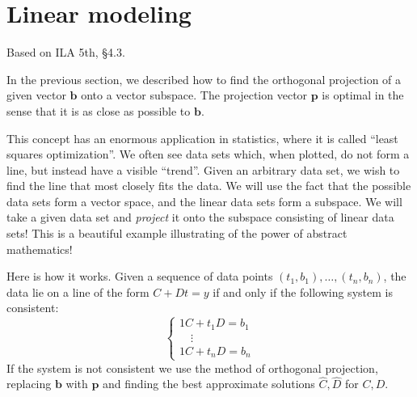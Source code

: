 \documentclass[11pt,oneside]{amsbook}
\theoremstyle{definition}
\theoremstyle{plain}
\theoremstyle{definition}
\theoremstyle{remark}
\numberwithin{equation}{section}
\numberwithin{figure}{section}
\begin{document}
\newpage
\section{Linear modeling}

Based on ILA 5th, \S 4.3.

In the previous section, we described how to find the orthogonal projection of a given vector $\bm{b}$ onto a vector subspace. The projection vector $\bm{p}$ is optimal in the sense that it is as close as possible to $\bm{b}$.

This concept has an enormous application in statistics, where it is called ``least squares optimization''. We often see data sets which, when plotted, do not form a line, but instead have a visible ``trend''. Given an arbitrary data set, we wish to find the line that most closely fits the data. We will use the fact that the possible data sets form a vector space, and the linear data sets form a subspace. We will take a given data set and \emph{project} it onto the subspace consisting of linear data sets! This is a beautiful example illustrating of the power of abstract mathematics!

Here is how it works. Given a sequence of data points $(t_1,b_1),\ldots,(t_n,b_n)$, the data lie on a line of the form $C+Dt=y$ if and only if the following system is consistent:
\[\begin{cases}1C+t_1 D=b_1\\\quad\vdots\\1C+t_nD=b_n\end{cases}
\]
If the system is not consistent we use the method of orthogonal projection, replacing $\bm{b}$ with $\bm{p}$ and finding the best approximate solutions $\hat C,\hat D$ for $C,D$.
\end{document}
